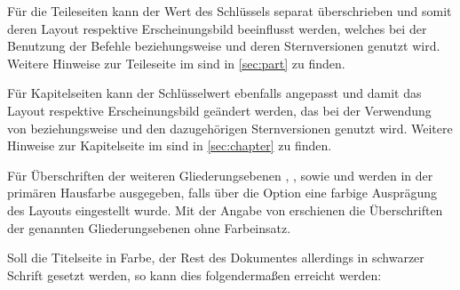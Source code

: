 \begin{Declaration*}{}
\begin{Declaration*}{}
\begin{Declaration*}{}
\begin{Declaration}[%
  v2.03!\Option{cdpart=bicolor}:%
    Farbeinsatz nur im Kopf mit farbig abgesetztem Querbalken;
  v2.03!\Option{cdpart=fullcolor}:%
    voller Farbeinsatz mit farbig abgesetztem Querbalken;
  v2.04!\Option{cdpart=barcolor}:nur farbig abgesetzter Querbalken;%
]{}
\printdeclarationlist%
%
%
Für die Teileseiten kann der Wert des Schlüssels  separat 
überschrieben und somit deren Layout respektive Erscheinungsbild beeinflusst 
werden, welches bei der Benutzung der Befehle  beziehungsweise 
 und deren Sternversionen genutzt wird. Weitere Hinweise zur 
Teileseite im \CD sind in \autoref{sec:part} zu finden.
\end{Declaration}

\begin{Declaration}[%
  v2.03!\Option{cdchapter=bicolor}:%
    Farbeinsatz nur im Kopf mit farbig abgesetztem Querbalken;
  v2.03!\Option{cdchapter=fullcolor}:%
    voller Farbeinsatz mit farbig abgesetztem Querbalken;
  v2.04!\Option{cdchapter=barcolor}:nur farbig abgesetzter Querbalken;%
]{}
\printdeclarationlist%
%
%
Für Kapitelseiten kann der Schlüsselwert  ebenfalls angepasst 
und damit das Layout respektive Erscheinungsbild geändert werden, das bei der 
Verwendung von  beziehungsweise  und den 
dazugehörigen Sternversionen genutzt wird. Weitere Hinweise zur Kapitelseite im 
\CD sind in \autoref{sec:chapter} zu finden.
\end{Declaration}

\begin{Declaration}[v2.05]{}
\printdeclarationlist%
%
Für Überschriften der weiteren Gliederungsebenen , 
,  sowie  und 
 werden in der primären Hausfarbe  ausgegeben, 
falls über die Option  eine farbige Ausprägung des Layouts 
eingestellt wurde. Mit der Angabe von  erschienen die 
Überschriften der genannten Gliederungsebenen ohne Farbeinsatz.
\end{Declaration}
%
\begin{Example}
Soll die Titelseite in Farbe, der Rest des Dokumentes allerdings in schwarzer 
Schrift gesetzt werden, so kann dies folgendermaßen erreicht werden:
%
%
\end{Example}



\end{Declaration*}
\end{Declaration*}
\end{Declaration*}
